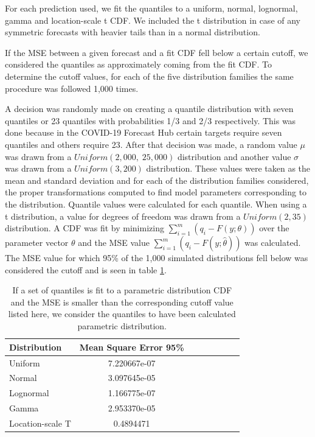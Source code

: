 \documentclass[11pt,notitlepage]{isuthesis}
\begin{document}
For each prediction used, we fit the quantiles to a uniform, normal, lognormal,
gamma and location-scale t CDF. We included the t distribution in case of any
symmetric forecasts with heavier tails than in a normal distribution.

If the MSE between a given forecast and a fit CDF fell below a certain cutoff,
we considered the quantiles as approximately coming from the fit CDF. To
determine the cutoff values, for each of the five distribution families the same
procedure was followed 1,000 times. 

A decision was randomly made on creating a quantile distribution with seven 
quantiles or 23
quantiles with probabilities 1/3 and 2/3 respectively. This was done because 
in the COVID-19 Forecast Hub certain targets require seven quantiles and others 
require 23. After that decision was made, a random value $\mu$ was drawn from
a $Uniform(2,000,\; 25,000)$ distribution and another value $\sigma$ was drawn
from a $Uniform(3, 200)$ distribution. These values were taken as the mean and
standard deviation and for each of the distribution families considered, the
proper transformations computed to find model parameters corresponding to the 
distribution. Quantile values were calculated for each quantile. When using a 
t distribution, a value for degrees of freedom was drawn from a 
$Uniform(2,35)$ distribution. A CDF
was fit by minimizing $\sum_{i=1}^m (q_i - F(y; \theta))$ over the parameter
vector $\theta$ and the MSE value $\sum_{i=1}^m (q_i - F(y; \hat{\theta}))$ was 
calculated. The MSE value for which 95\% of the 1,000 simulated distributions
fell below was considered the cutoff and is seen in table 
\ref{table:quantcutoffs}.

\begin{table}[h!]
  \centering
  \begin{tabular}{l*{6}{c}r}
  Distribution          & Mean Square Error 95\%  \\
  \hline
  Uniform               & 7.220667e-07   \\
  Normal                & 3.097645e-05  \\
  Lognormal             & 1.166775e-07  \\
  Gamma                 & 2.953370e-05  \\
  Location-scale T      & 0.4894471 \\
  \end{tabular}
  \caption[Quantile cutoff values]{If a set of quantiles
  is fit to a parametric distribution CDF and the MSE is smaller than
  the corresponding cutoff value listed here, we consider the quantiles to 
  have been calculated parametric distribution.}
  \label{table:quantcutoffs}
\end{table}
\end{document}
